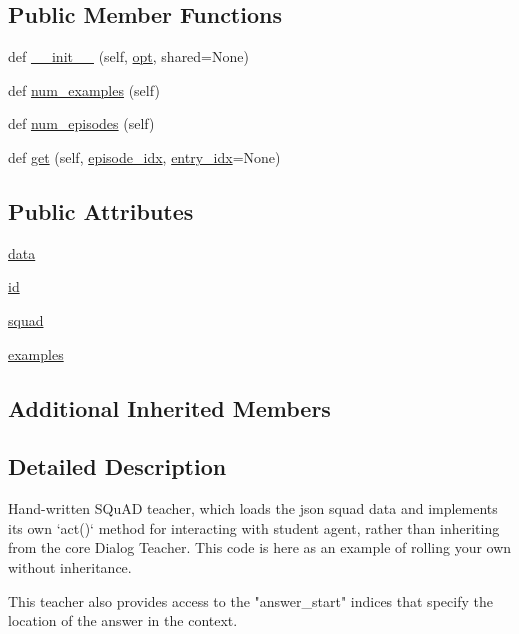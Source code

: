 \subsection*{Public Member Functions}
\begin{DoxyCompactItemize}
\item 
def \hyperlink{classparlai_1_1tasks_1_1squad2_1_1agents_1_1IndexTeacher_a11e053a7da91de71216a538505257ae2}{\+\_\+\+\_\+init\+\_\+\+\_\+} (self, \hyperlink{classparlai_1_1core_1_1agents_1_1Teacher_a3ce6243860ce978a897922863ed32fa4}{opt}, shared=None)
\item 
def \hyperlink{classparlai_1_1tasks_1_1squad2_1_1agents_1_1IndexTeacher_af85b15f1fe388fef825a5df688eac522}{num\+\_\+examples} (self)
\item 
def \hyperlink{classparlai_1_1tasks_1_1squad2_1_1agents_1_1IndexTeacher_aabf2ad3a489d5b1547afa2aaac7b5b79}{num\+\_\+episodes} (self)
\item 
def \hyperlink{classparlai_1_1tasks_1_1squad2_1_1agents_1_1IndexTeacher_a55e2945cb45316a80fc158e8f13eb0ac}{get} (self, \hyperlink{classparlai_1_1core_1_1teachers_1_1FixedDialogTeacher_afd4ebab8063eb42d182d30a1a41f133e}{episode\+\_\+idx}, \hyperlink{classparlai_1_1core_1_1teachers_1_1FixedDialogTeacher_ae3201b15f3c3b46a2f3511bad9b43e7d}{entry\+\_\+idx}=None)
\end{DoxyCompactItemize}
\subsection*{Public Attributes}
\begin{DoxyCompactItemize}
\item 
\hyperlink{classparlai_1_1tasks_1_1squad2_1_1agents_1_1IndexTeacher_abb04c653cc52c06137a52a47c68e02b3}{data}
\item 
\hyperlink{classparlai_1_1tasks_1_1squad2_1_1agents_1_1IndexTeacher_a8d371520b687f1035ce70e88c0ea4e91}{id}
\item 
\hyperlink{classparlai_1_1tasks_1_1squad2_1_1agents_1_1IndexTeacher_a6f328f6c5362d94d609cc8dad6da9fca}{squad}
\item 
\hyperlink{classparlai_1_1tasks_1_1squad2_1_1agents_1_1IndexTeacher_ae83acc001e0059480f6d8a57e260f95b}{examples}
\end{DoxyCompactItemize}
\subsection*{Additional Inherited Members}


\subsection{Detailed Description}
\begin{DoxyVerb}Hand-written SQuAD teacher, which loads the json squad data and implements its own
`act()` method for interacting with student agent, rather than inheriting from the
core Dialog Teacher. This code is here as an example of rolling your own without
inheritance.

This teacher also provides access to the "answer_start" indices that specify the
location of the answer in the context.
\end{DoxyVerb}
 

